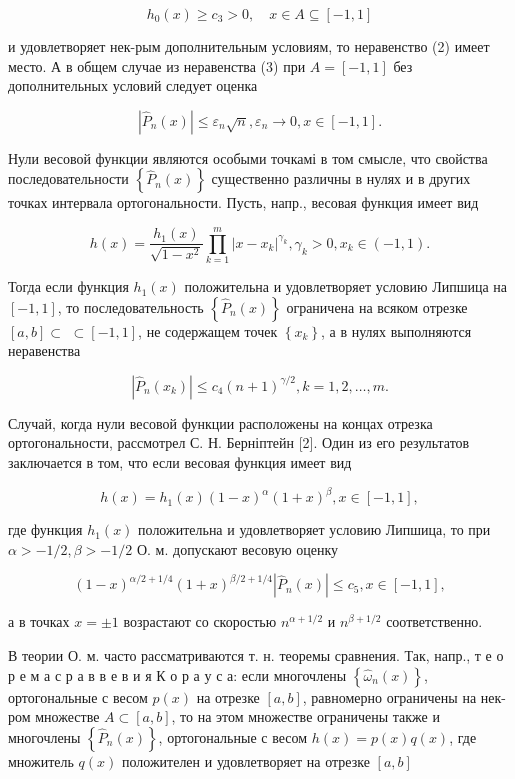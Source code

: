 \documentclass[10pt]{article}
\begin{document}
\[
h_{0}(x) \geqslant c_{3}>0, \quad x \in A \subseteq[-1,1]
\]

и удовлетворяет нек-рым дополнительным условиям, то неравенство (2) имеет место. А в общем случае из неравенства (3) при $A=[-1,1]$ без дополнительных условий следует оценка

\[
\left|\hat{P}_{n}(x)\right| \leqslant \varepsilon_{n} \sqrt{n}, \varepsilon_{n} \longrightarrow 0, x \in[-1,1] .
\]

Нули весовой функции являются особыми точкамі в том смысле, что свойства последовательности $\left\{\hat{P}_{n}(x)\right\}$ существенно различны в нулях и в других точках интервала ортогональности. Пусть, напр., весовая функция имеет вид

\[
h(x)=\frac{h_{1}(x)}{\sqrt{1-x^{2}}} \prod_{k=1}^{m}\left|x-x_{k}\right|^{\gamma_{k}}, \gamma_{k}>0, x_{k} \in(-1,1) .
\]

Тогда если функция $h_{1}(x)$ положительна и удовлетворяет условию Липшица на $[-1,1]$, то последовательность $\left\{\hat{P}_{n}(x)\right\}$ ограничена на всяком отрезке $[a, b] \subset$ $\subset[-1,1]$, не содержащем точек $\left\{x_{k}\right\}$, а в нулях выполняются неравенства

\[
\left|\hat{P}_{n}\left(x_{k}\right)\right| \leqslant c_{4}(n+1)^{\gamma / 2}, k=1,2, \ldots, m .
\]

Случай, когда нули весовой функции расположены на концах отрезка ортогональности, рассмотрел С. Н. Берніптейн [2]. Один из его результатов заключается в том, что если весовая функция имеет вид

\[
h(x)=h_{1}(x)(1-x)^{\alpha}(1+x)^{\beta}, x \in[-1,1],
\]

где функция $h_{1}(x)$ положительна и удовлетворяет условию Липшица, то при $\alpha>-1 / 2, \beta>-1 / 2$ О. м. допускают весовую оценку

\[
(1-x)^{\alpha / 2+1 / 4}(1+x)^{\beta / 2+1 / 4}\left|\hat{P}_{n}(x)\right| \leqslant c_{5}, x \in[-1,1],
\]

а в точках $x= \pm 1$ возрастают со скоростью $n^{\alpha+1 / 2}$ и $n^{\beta+1 / 2}$ соответственно.

В теории О. м. часто рассматриваются т. н. теоремы сравнения. Так, напр., т е о р е м а с р а в в е в и я К о р а у с а: если многочлены $\left\{\hat{\omega}_{n}(x)\right\}$, ортогональные с весом $p(x)$ на отрезке $[a, b]$, равномерно ограничены на нек-ром множестве $A \subset[a, b]$, то на этом множестве ограничены также и многочлены $\left\{\hat{P}_{n}(x)\right\}$, ортогональные с весом $h(x)=p(x) q(x)$, где множитель $q(x)$ положителен и удовлетворяет на отрезке $[a, b]$
\end{document}
